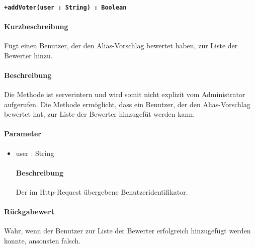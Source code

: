 \paragraph*{\texttt{+addVoter(user : String) : Boolean}}%
\paragraph*{Kurzbeschreibung}
Fügt einen Benutzer, der den Alias-Vorschlag bewertet haben, zur Liste der Bewerter hinzu.
\paragraph*{Beschreibung}
Die Methode ist serverintern und wird somit nicht explizit vom Administrator aufgerufen.
Die Methode ermöglicht, dass ein Benutzer, der den Alias-Vorschlag bewertet hat, zur Liste der Bewerter hinzugefüt werden kann.
\paragraph*{Parameter}
\begin{itemize}
    \item user : String
    		\paragraph*{Beschreibung}
    		Der im Http-Request übergebene Benutzeridentifikator.
\end{itemize}
\paragraph*{Rückgabewert}
Wahr, wenn der Benutzer zur Liste der Bewerter erfolgreich hinzugefügt werden konnte, ansonsten falsch.
